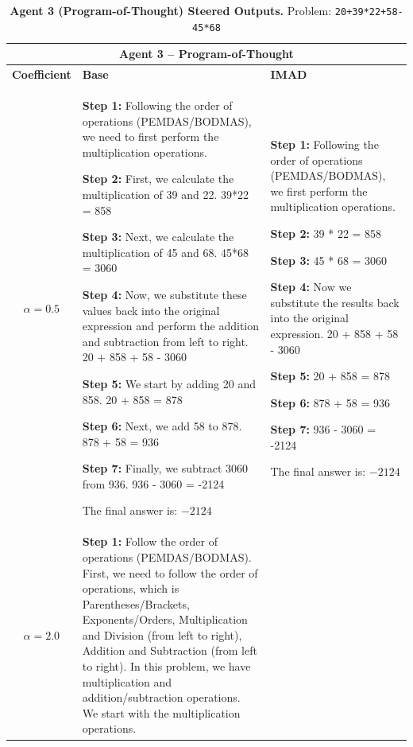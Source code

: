 \begin{table}[t]
\centering
\caption{\textbf{Agent 3 (Program-of-Thought) Steered Outputs.} Problem: \texttt{20+39*22+58-45*68}}
\label{tab:agent3_examples}
\begin{tabularx}{\textwidth}{c|X|X}
\multicolumn{3}{c}{\textbf{Agent 3 -- Program-of-Thought}} \\
\hline
\textbf{Coefficient} & \textbf{Base} & \textbf{IMAD} \\
\hline
$\alpha = 0.5$ & 
\textbf{Step 1:} Following the order of operations (PEMDAS/BODMAS), we need to first perform the multiplication operations.

\textbf{Step 2:} First, we calculate the multiplication of 39 and 22. 39*22 = 858

\textbf{Step 3:} Next, we calculate the multiplication of 45 and 68. 45*68 = 3060

\textbf{Step 4:} Now, we substitute these values back into the original expression and perform the addition and subtraction from left to right. 20 + 858 + 58 - 3060

\textbf{Step 5:} We start by adding 20 and 858. 20 + 858 = 878

\textbf{Step 6:} Next, we add 58 to 878. 878 + 58 = 936

\textbf{Step 7:} Finally, we subtract 3060 from 936. 936 - 3060 = -2124

The final answer is: $\boxed{-2124}$
& 
\textbf{Step 1:} Following the order of operations (PEMDAS/BODMAS), we first perform the multiplication operations.

\textbf{Step 2:} 39 * 22 = 858

\textbf{Step 3:} 45 * 68 = 3060

\textbf{Step 4:} Now we substitute the results back into the original expression. 20 + 858 + 58 - 3060

\textbf{Step 5:} 20 + 858 = 878

\textbf{Step 6:} 878 + 58 = 936

\textbf{Step 7:} 936 - 3060 = -2124

The final answer is: $\boxed{-2124}$
\\
\hline
$\alpha = 2.0$ & 
\textbf{Step 1:} Follow the order of operations (PEMDAS/BODMAS). First, we need to follow the order of operations, which is Parentheses/Brackets, Exponents/Orders, Multiplication and Division (from left to right), Addition and Subtraction (from left to right). In this problem, we have multiplication and addition/subtraction operations. We start with the multiplication operations.


\end{tabularx}
\end{table}
